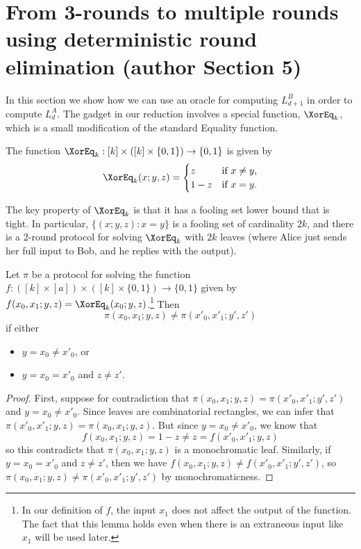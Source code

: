 \section*{From 3-rounds to multiple rounds using deterministic round elimination (author Section 5)}
In this section we show how we can use an oracle for computing $L_{d+1}^B$ in order to compute $L_d^A$. The gadget in our reduction involves a special function, $\XorEq_k$, which is a small modification of the standard Equality function.
\begin{definition}
The function $\XorEq_k:[k]\times([k]\times\{0,1\})\to\{0,1\}$ is given by
\[\XorEq_k(x;y,z)=\begin{cases}z&\text{if }x\ne y,\\1-z&\text{if }x=y.\end{cases}\]
\end{definition}
The key property of $\XorEq_k$ is that it has a fooling set lower bound that is tight. In particular, $\{(x;y,z):x=y\}$ is a fooling set of cardinality $2k$, and there is a 2-round protocol for solving $\XorEq_k$ with $2k$ leaves (where Alice just sends her full input to Bob, and he replies with the output).
\begin{lemma}\label{lem:fooling}
Let $\pi$ be a protocol for solving the function $f:([k]\times[a])\times([k]\times\{0,1\})\to\{0,1\}$ given by $f(x_0,x_1;y,z)=\XorEq_k(x_0;y,z)$.\footnote{In our definition of $f$, the input $x_1$ does not affect the output of the function. The fact that this lemma holds even when there is an extraneous input like $x_1$ will be used later.} Then
\[\pi(x_0,x_1;y,z)\ne\pi(x'_0,x'_1;y',z')\]
if either
\begin{itemize}
\item $y=x_0\ne x'_0$, or
\item $y=x_0=x'_0$ and $z\ne z'$.
\end{itemize}
\end{lemma}
\begin{proof}
First, suppose for contradiction that $\pi(x_0,x_1;y,z)=\pi(x'_0,x'_1;y',z')$ and $y=x_0\ne x'_0$. Since leaves are combinatorial rectangles, we can infer that $\pi(x'_0,x'_1;y,z)=\pi(x_0,x_1;y,z)$. But since $y=x_0\ne x'_0$, we know that
\[f(x_0,x_1;y,z)=1-z\ne z=f(x'_0,x'_1;y,z)\]
so this contradicts that $\pi(x_0,x_1;y,z)$ is a monochromatic leaf.
Similarly, if $y=x_0=x'_0$ and $z\ne z'$, then we have $f(x_0,x_1;y,z)\ne f(x'_0,x'_1;y',z')$, so $\pi(x_0,x_1;y,z)\ne\pi(x'_0,x'_1;y',z')$ by monochromaticness.
\end{proof}

